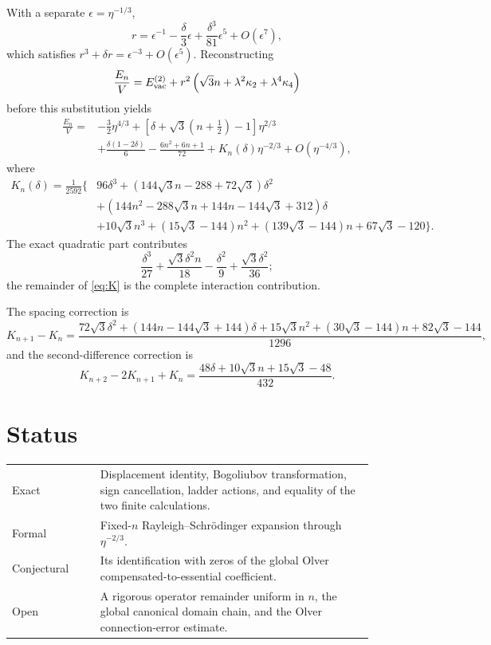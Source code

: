 \documentclass[11pt]{article}
\begin{document}
With a separate \(\epsilon=\eta^{-1/3}\),
\[
r=\epsilon^{-1}-\frac{\delta}{3}\epsilon
+\frac{\delta^3}{81}\epsilon^5+O(\epsilon^7),
\]
which satisfies \(r^3+\delta r=\epsilon^{-3}+O(\epsilon^5)\).
Reconstructing
\[
\frac{E_n}{V}=E_{\rm vac}^{(2)}+r^2
\left(\sqrt3n+\lambda^2\kappa_2+\lambda^4\kappa_4\right)
\]
before this substitution yields
\begin{equation}
\boxed{\begin{aligned}
\frac{E_n}{V}={}&-\frac32\eta^{4/3}
+\left[\delta+\sqrt3(n+\tfrac12)-1\right]\eta^{2/3}\\
&+\frac{\delta(1-2\delta)}6-\frac{6n^2+6n+1}{72}
+K_n(\delta)\eta^{-2/3}+O(\eta^{-4/3}),
\end{aligned}}
\end{equation}
where
\begin{align}
K_n(\delta)=\frac1{2592}\bigl\{&
96\delta^3+(144\sqrt3n-288+72\sqrt3)\delta^2\nonumber\\
&+(144n^2-288\sqrt3n+144n-144\sqrt3+312)\delta\nonumber\\
&+10\sqrt3n^3+(15\sqrt3-144)n^2
+(139\sqrt3-144)n+67\sqrt3-120\bigr\}.
\label{eq:K}
\end{align}
The exact quadratic part contributes
\[
\frac{\delta^3}{27}+\frac{\sqrt3\delta^2n}{18}
-\frac{\delta^2}{9}+\frac{\sqrt3\delta^2}{36};
\]
the remainder of \eqref{eq:K} is the complete interaction contribution.

The spacing correction is
\[
K_{n+1}-K_n=\frac{
72\sqrt3\delta^2+(144n-144\sqrt3+144)\delta
+15\sqrt3n^2+(30\sqrt3-144)n+82\sqrt3-144}{1296},
\]
and the second-difference correction is
\[
K_{n+2}-2K_{n+1}+K_n
=\frac{48\delta+10\sqrt3n+15\sqrt3-48}{432}.
\]

\section{Status}
\begin{center}
\begin{tabular}{p{0.22\linewidth}p{0.68\linewidth}}
\hline
Exact & Displacement identity, Bogoliubov transformation, sign cancellation,
ladder actions, and equality of the two finite calculations.\\
Formal & Fixed-\(n\) Rayleigh--Schr\"odinger expansion through
\(\eta^{-2/3}\).\\
Conjectural & Its identification with zeros of the global Olver
compensated-to-essential coefficient.\\
Open & A rigorous operator remainder uniform in \(n\), the global canonical
domain chain, and the Olver connection-error estimate.\\ \hline
\end{tabular}
\end{center}
\end{document}
